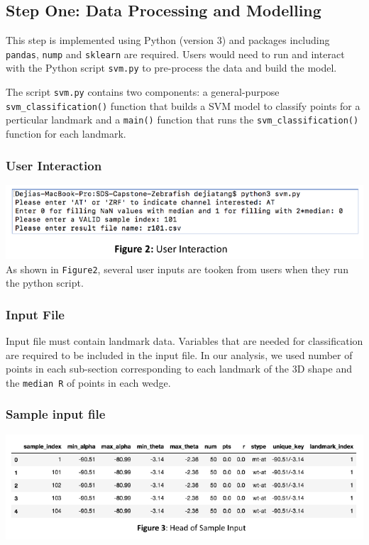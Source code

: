 \documentclass[10pt,letterpaper]{article}
\begin{document}
\subsection{Step One: Data Processing and
Modelling}\label{step-one-data-processing-and-modelling}

This step is implemented using Python (version 3) and packages including
\texttt{pandas}, \texttt{nump} and \texttt{sklearn} are required. Users
would need to run and interact with the Python script \texttt{svm.py} to
pre-process the data and build the model.

The script \texttt{svm.py} contains two components: a general-purpose
\texttt{svm\_classification()} function that builds a SVM model to
classify points for a perticular landmark and a \texttt{main()} function
that runs the \texttt{svm\_classification()} function for each landmark.

\subsubsection{User Interaction}\label{user-interaction}

\includegraphics{zebrafish_paper_files/figure-latex/unnamed-chunk-3-1.pdf}
As shown in \texttt{Figure2}, several user inputs are tooken from users
when they run the python script.

\subsubsection{Input File}\label{input-file}

Input file must contain landmark data. Variables that are needed for
classification are required to be included in the input file. In our
analysis, we used number of points in each sub-section corresponding to
each landmark of the 3D shape and the \texttt{median\ R} of points in
each wedge.

\subsubsection{Sample input file}\label{sample-input-file}

\includegraphics{zebrafish_paper_files/figure-latex/unnamed-chunk-4-1.pdf}
\end{document}
